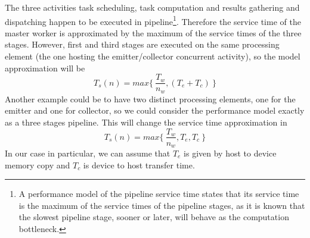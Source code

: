 	The three activities \textendash task scheduling, task computation and results gathering and dispatching \textendash happen to be executed in pipeline\footnote{A performance model of the pipeline service time states that its service time is the maximum of the service times of the pipeline stages, as it is known that the slowest pipeline stage, sooner or later, will behave as the	computation bottleneck.}. Therefore the service time of the master worker is approximated by the maximum of the service times of the three stages. However, first and third stages are executed on the same processing element (the one hosting the emitter/collector concurrent activity), so the model approximation will be
	\begin{equation}
		T_s(n) = max\{\ \frac{T_w}{n_w}, (T_e + T_c)\ \}
	\end{equation}
	Another example could be to have two distinct processing elements, one for the emitter and one for collector, so we could consider the performance model exactly as a three stages pipeline\cite{spm}. This will change the service time approximation in
	\begin{equation}
		T_s(n) = max\{\ \frac{T_w}{n_w}, T_e, T_c \ \}
	\end{equation}
	In our case in particular, we can assume that \(T_e\) is given by host to device memory copy and \(T_c\) is device to host transfer time.
	\vspace{0.3cm}
		
